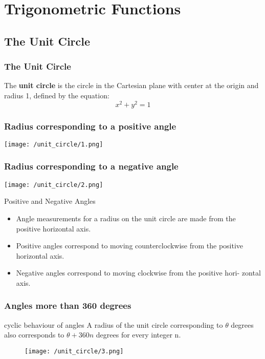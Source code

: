 \section{Trigonometric Functions}


\subsection{The Unit Circle}
\begin{frame}
    \frametitle{The Unit Circle}
\begin{definition}
    The \textbf{unit circle} is the circle in the Cartesian plane with center at the origin and radius 1, defined by the equation:
    \[
    x^2 + y^2 = 1
    \]
\end{definition}                                                                                                                                    
\end{frame}


 \begin{frame}
        \frametitle{Radius corresponding to a positive angle}
        \centering
        \texttt{[image: /unit\_circle/1.png]}
    \end{frame}
    
    \begin{frame}
        \frametitle{Radius corresponding to a negative angle}
        \centering
        \texttt{[image: /unit\_circle/2.png]}

    \end{frame}
    
    \begin{frame}
        \begin{block}{Positive and Negative Angles}
            \begin{itemize}
                \item Angle measurements for a radius on the unit circle are made from the
                positive horizontal axis.
                \item Positive angles correspond to moving counterclockwise from the positive
                horizontal axis.
                \item Negative angles correspond to moving clockwise from the positive hori-
                zontal axis.
            \end{itemize}
        \end{block}
    \end{frame}
    
    \begin{frame}
        \frametitle{Angles more than 360 degrees}
    \begin{block}{cyclic behaviour of angles}
        A radius of the unit circle corresponding to $\theta$ degrees also corresponds to
    $\theta + 360n$ degrees for every integer n.
    \end{block}
        \begin{figure}[h]    
            \centering
            \texttt{[image: /unit\_circle/3.png]}
        \end{figure}
        
    \end{frame}
    


